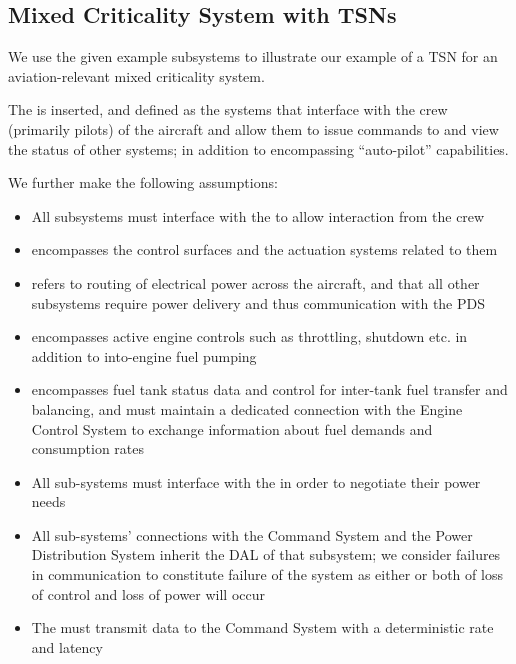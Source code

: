 
\subsection{Mixed Criticality System with TSNs}

We use the given example subsystems to illustrate our example of a TSN for an aviation-relevant mixed criticality system.

The  is inserted, and defined as the systems that interface with the crew (primarily pilots) of the aircraft and allow them to issue commands to and view the status of other systems; in addition to encompassing ``auto-pilot'' capabilities.

We further make the following assumptions:

\begin{itemize}
    \item All subsystems must interface with the  to allow interaction from the crew
    \item {} encompasses the control surfaces and the actuation systems related to them
    \item {} refers to routing of electrical power across the aircraft, and that all other subsystems require power delivery and thus communication with the PDS
    \item {} encompasses active engine controls such as throttling, shutdown etc. in addition to into-engine fuel pumping
    \item {} encompasses fuel tank status data and control for inter-tank fuel transfer and balancing, and must maintain a dedicated connection with the Engine Control System to exchange information about fuel demands and consumption rates
    \item All sub-systems must interface with the  in order to negotiate their power needs
    \item All sub-systems' connections with the Command System and the Power Distribution System inherit the DAL of that subsystem; we consider failures in communication to constitute failure of the system as either or both of loss of control and loss of power will occur
    \item The  must transmit data to the Command System with a deterministic rate and latency
\end{itemize}


